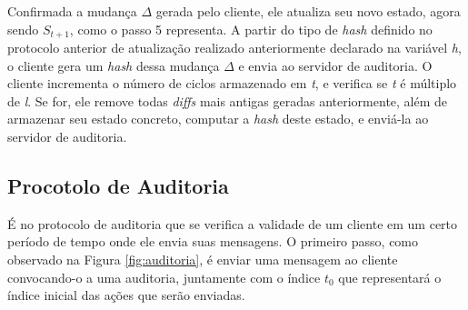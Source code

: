 Confirmada a mudança $\Delta$ gerada pelo cliente, ele atualiza seu novo estado, agora sendo $S_{t+1}$, como o passo 5 representa. A partir do tipo de \textit{hash} definido no protocolo anterior de atualização realizado anteriormente declarado na variável \textit{h}, o cliente gera um \textit{hash} dessa mudança $\Delta$ e envia ao servidor de auditoria. O cliente incrementa o número de ciclos armazenado em \textit{t}, e verifica se \textit{t} é múltiplo de \textit{l}. Se for, ele remove todas \textit{diffs} mais antigas geradas anteriormente, além de armazenar seu estado concreto, computar a \textit{hash} deste estado, e enviá-la ao servidor de auditoria.

\subsection{Procotolo de Auditoria}
\label{protocoloAuditoria}

É no protocolo de auditoria que se verifica a validade de um cliente em um certo período de tempo onde ele envia suas mensagens. O primeiro passo, como observado na Figura \ref{fig:auditoria}, é enviar uma mensagem ao cliente convocando-o a uma auditoria, juntamente com o índice $t_0$ que representará o índice inicial das ações que serão enviadas.

